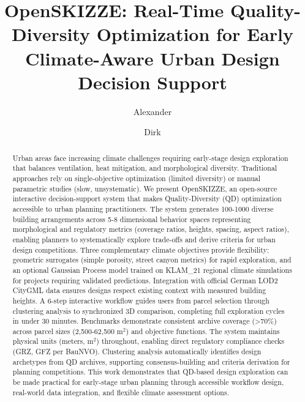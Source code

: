 \documentclass[times,final]{elsarticle}
\begin{document}
	
	
\begin{frontmatter}

\title{OpenSKIZZE: Real-Time Quality-Diversity Optimization for Early Climate-Aware Urban Design Decision Support}

\author[1]{Alexander }
\author[1,2]{Dirk }

\address[1]{Institute of Technology, Resource and Energy-Efficient Engineering, Bonn-Rhein-Sieg University of Applied Sciences, Sankt Augustin, Germany}
\address[2]{Fraunhofer Institute for Algorithms and Scientific Computing (SCAI), Sankt Augustin, Germany}

\begin{abstract}
Urban areas face increasing climate challenges requiring early-stage design exploration that balances ventilation, heat mitigation, and morphological diversity. Traditional approaches rely on single-objective optimization (limited diversity) or manual parametric studies (slow, unsystematic). We present OpenSKIZZE, an open-source interactive decision-support system that makes Quality-Diversity (QD) optimization accessible to urban planning practitioners. The system generates 100-1000 diverse building arrangements across 5-8 dimensional behavior spaces representing morphological and regulatory metrics (coverage ratios, heights, spacing, aspect ratios), enabling planners to systematically explore trade-offs and derive criteria for urban design competitions. Three complementary climate objectives provide flexibility: geometric surrogates (simple porosity, street canyon metrics) for rapid exploration, and an optional Gaussian Process model trained on KLAM\_21 regional climate simulations for projects requiring validated predictions. Integration with official German LOD2 CityGML data ensures designs respect existing context with measured building heights. A 6-step interactive workflow guides users from parcel selection through clustering analysis to synchronized 3D comparison, completing full exploration cycles in under 30 minutes. Benchmarks demonstrate consistent archive coverage (>70\%) across parcel sizes (2,500-62,500 m$^2$) and objective functions. The system maintains physical units (meters, m$^2$) throughout, enabling direct regulatory compliance checks (GRZ, GFZ per BauNVO). Clustering analysis automatically identifies design archetypes from QD archives, supporting consensus-building and criteria derivation for planning competitions. This work demonstrates that QD-based design exploration can be made practical for early-stage urban planning through accessible workflow design, real-world data integration, and flexible climate assessment options.
\end{abstract}


\end{frontmatter}
\end{document}
